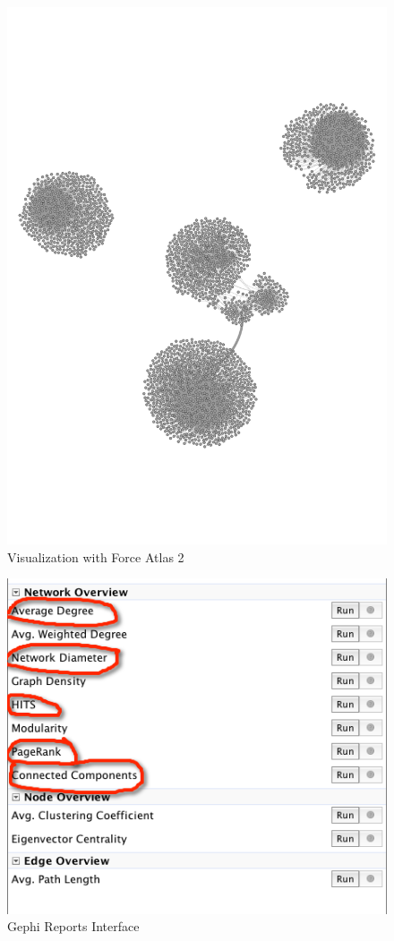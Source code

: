 \documentclass{article}
\begin{document}
\begin{figure}[H]
\centering
\includegraphics[scale=0.60]{q3/visualization02}
\caption{Visualization with Force Atlas 2}
\label{forceatlas}
\end{figure}

\begin{figure}[H]
\centering
\includegraphics[scale=0.70]{q3/gephireports}
\caption{Gephi Reports Interface}
\label{gephiinterface}
\end{figure}
\end{document}
